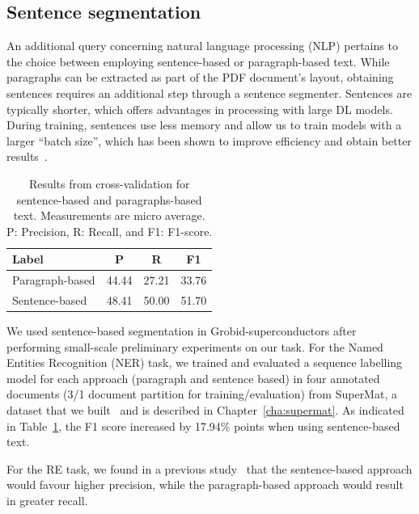 \subsection{Sentence segmentation}
An additional query concerning natural language processing (NLP) pertains to the choice between employing sentence-based or paragraph-based text.
While paragraphs can be extracted as part of the PDF document's layout, obtaining sentences requires an additional step through a sentence segmenter. Sentences are typically shorter, which offers advantages in processing with large DL models.
During training, sentences use less memory and allow us to train models with a larger ``batch size'', which has been shown to improve efficiency and obtain better results~\cite{liu2019roberta}. 

\begin{table}[ht]
    \centering
    \caption{Results from cross-validation for sentence-based and paragraphs-based text. Measurements are micro average. P: Precision, R: Recall, and F1: F1-score.}
    
    \begin{tabular}{lccc}
        \toprule
        \textbf{Label}   & \textbf{P}   & \textbf{R}    & \textbf{F1} \\
        \midrule
        Paragraph-based  & 44.44        & 27.21         & 33.76       \\
        Sentence-based   & 48.41        & 50.00         & 51.70       \\
        \bottomrule
    \end{tabular}

    \label{tab:comparison-evaluation-sentences-paragraphs}
\end{table}

We used sentence-based segmentation in Grobid-superconductors after performing small-scale preliminary experiments on our task. 
For the Named Entities Recognition (NER) task, we trained and evaluated a sequence labelling model for each approach (paragraph and sentence based) in four annotated documents (3/1 document partition for training/evaluation) from SuperMat, a dataset that we built~\cite{foppiano2021supermat} and is described in Chapter~\ref{cha:supermat}.
As indicated in Table~\ref{tab:comparison-evaluation-sentences-paragraphs}, the F1 score increased by 17.94\% points when using sentence-based text.

For the RE task, we found in a previous study~\cite{foppiano2019proposal} that the sentence-based approach would favour higher precision, while the paragraph-based approach would result in greater recall.

